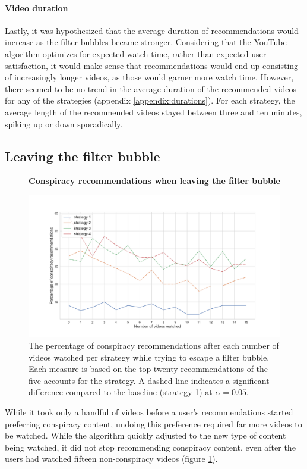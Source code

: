 \documentclass[../main.tex]{subfiles}
\begin{document}
\paragraph{Video duration}
Lastly, it was hypothesized that the average duration of recommendations would increase as the filter bubbles
became stronger. Considering that the YouTube algorithm optimizes for expected watch time, rather than expected
user satisfaction, it would make sense that recommendations would end up consisting of increasingly longer
videos, as those would garner more watch time. However, there seemed to be no trend in the average duration of
the recommended videos for any of the strategies (appendix \ref{appendix:durations}). For each strategy, the
average length of the recommended videos stayed between three and ten minutes, spiking up or down sporadically.

\subsection{Leaving the filter bubble}

\begin{figure}[t]
  \textbf{Conspiracy recommendations when leaving the filter bubble}\par\medskip
  \centering
  \includegraphics[keepaspectratio, width=\textwidth]{images/conspiracy_recs_2.pdf}
  \caption{The percentage of conspiracy recommendations after each number of videos watched per strategy while trying to escape a filter bubble. Each measure is based on the top twenty recommendations of the five accounts for the strategy. A dashed line indicates a significant difference compared to the baseline (strategy 1) at $\alpha = 0.05$.}
  \label{fig:con_recs_2}
\end{figure}

While it took only a handful of videos before a user's recommendations started preferring conspiracy content, 
undoing this preference required far more videos to be watched. While the algorithm quickly adjusted to the 
new type of content being watched, it did not stop recommending conspiracy content, even after the users had
watched fifteen non-conspiracy videos (figure \ref{fig:con_recs_2}). 
\end{document}
